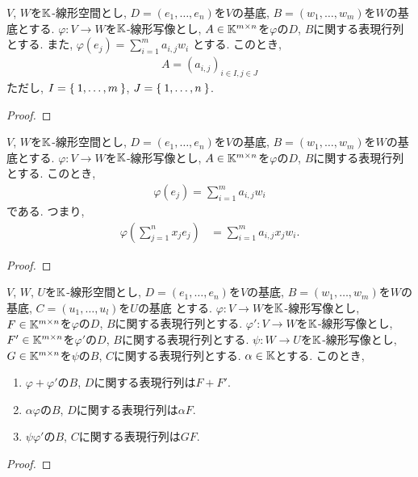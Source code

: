 \begin{prop}
  $V$, $W$を$\mathbb{K}$-線形空間とし,
  $D=(e_1,\ldots,e_n)$を$V$の基底,
  $B=(w_1,\ldots,w_m)$を$W$の基底とする.
  $\varphi\colon V\to W$を$\mathbb{K}$-線形写像とし,
  $A\in\mathbb{K}^{m\times n}$を$\varphi$の$D$, $B$に関する表現行列とする.
  また,
  $\varphi(e_j)=\sum_{i=1}^m a_{i,j} w_i$
  とする.
  このとき,
\begin{align*}
  A=(a_{i,j})_{i\in I, j\in J}
\end{align*}
ただし,
$I=\Set{1,\ldots,m}$,
$J=\Set{1,\ldots,n}$.
\end{prop}
\begin{proof}\end{proof}


\begin{prop}
  $V$, $W$を$\mathbb{K}$-線形空間とし,
  $D=(e_1,\ldots,e_n)$を$V$の基底,
  $B=(w_1,\ldots,w_m)$を$W$の基底とする.
  $\varphi\colon V\to W$を$\mathbb{K}$-線形写像とし,
  $A\in\mathbb{K}^{m\times n}$を$\varphi$の$D$, $B$に関する表現行列とする.
このとき,
\begin{align*}
  \varphi(e_j)=\sum_{i=1}^m a_{i,j}w_i
\end{align*}
である.
つまり,
\begin{align*}
  \varphi(\sum_{j=1}^n x_j e_j)
  &=\sum_{i=1}^m a_{i,j}x_jw_i.
\end{align*}
\end{prop}
\begin{proof}\end{proof}


\begin{prop}
  $V$, $W$, $U$を$\mathbb{K}$-線形空間とし,
  $D=(e_1,\ldots,e_n)$を$V$の基底,
  $B=(w_1,\ldots,w_m)$を$W$の基底,
  $C=(u_1,\ldots,u_l)$を$U$の基底
  とする.
  $\varphi\colon V\to W$を$\mathbb{K}$-線形写像とし,
  $F\in\mathbb{K}^{m\times n}$を$\varphi$の$D$, $B$に関する表現行列とする.
  $\varphi'\colon V\to W$を$\mathbb{K}$-線形写像とし,
  $F'\in\mathbb{K}^{m\times n}$を$\varphi'$の$D$, $B$に関する表現行列とする.
  $\psi\colon W\to U$を$\mathbb{K}$-線形写像とし,
  $G\in\mathbb{K}^{m\times n}$を$\psi$の$B$, $C$に関する表現行列とする.
  $\alpha\in \mathbb{K}$とする.
このとき,
\begin{enumerate}
  \item $\varphi+\varphi'$の$B$, $D$に関する表現行列は$F+F'$.
  \item $\alpha\varphi$の$B$, $D$に関する表現行列は$\alpha F$.
  \item $\psi\varphi'$の$B$, $C$に関する表現行列は$GF$.
\end{enumerate}
\end{prop}
\begin{proof}\end{proof}



